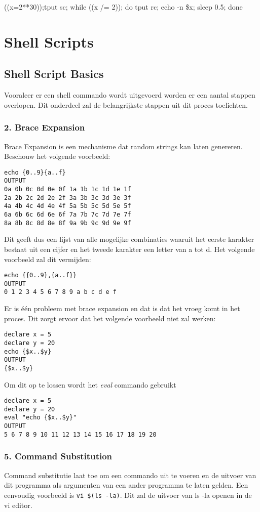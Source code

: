\documentclass{report}
\begin{document}
((x=2**30));tput sc; while ((x /= 2)); do tput rc; echo -n \$x; sleep 0.5; done

\chapter{Shell Scripts}
\section{Shell Script Basics}
Vooraleer er een shell commando wordt uitgevoerd worden er een aantal stappen overlopen. Dit onderdeel zal de belangrijkste stappen uit dit proces toelichten.

\subsection{2. Brace Expansion}
Brace Expansion is een mechanisme dat random strings kan laten genereren. Beschouw het volgende voorbeeld:
\begin{lstlisting}
echo {0..9}{a..f}
OUTPUT
0a 0b 0c 0d 0e 0f 1a 1b 1c 1d 1e 1f 
2a 2b 2c 2d 2e 2f 3a 3b 3c 3d 3e 3f 
4a 4b 4c 4d 4e 4f 5a 5b 5c 5d 5e 5f 
6a 6b 6c 6d 6e 6f 7a 7b 7c 7d 7e 7f 
8a 8b 8c 8d 8e 8f 9a 9b 9c 9d 9e 9f

\end{lstlisting}
Dit geeft dus een lijst van alle mogelijke combinaties waaruit het eerste karakter bestaat uit een cijfer en het tweede karakter een letter van a tot d. Het volgende voorbeeld zal dit vermijden:
\begin{lstlisting}
echo {{0..9},{a..f}}
OUTPUT
0 1 2 3 4 5 6 7 8 9 a b c d e f
\end{lstlisting}
Er is één probleem met brace expansion en dat is dat het vroeg komt in het proces. Dit zorgt ervoor dat het volgende voorbeeld niet zal werken:
\begin{lstlisting}
declare x = 5
declare y = 20
echo {$x..$y}
OUTPUT
{$x..$y}
\end{lstlisting}
Om dit op te lossen wordt het \textit{eval} commando gebruikt
\begin{lstlisting}
declare x = 5
declare y = 20
eval "echo {$x..$y}"
OUTPUT
5 6 7 8 9 10 11 12 13 14 15 16 17 18 19 20
\end{lstlisting}

\subsection{5. Command Substitution}
Command substitutie laat toe om een commando uit te voeren en de uitvoer van dit programma als argumenten van een ander programma te laten gelden. Een eenvoudig voorbeeld is 
\texttt{vi \$(ls -la)}. Dit zal de uitvoer van ls -la openen in de vi editor.
\end{document}
